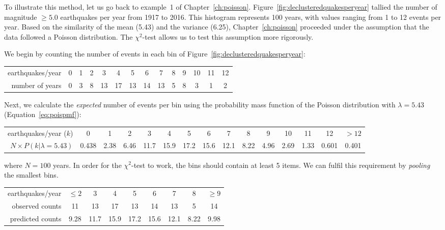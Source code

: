 To illustrate this method, let us go back to example~1 of
Chapter~\ref{ch:poisson}. Figure~\ref{fig:declusteredquakesperyear}
tallied the number of magnitude $\geq{5.0}$ earthquakes per year from
1917 to 2016.  This histogram represents 100 years, with values
ranging from 1 to 12 events per year. Based on the similarity of the
mean (5.43) and the variance (6.25), Chapter~\ref{ch:poisson}
proceeded under the assumption that the data followed a Poisson
distribution.  The $\chi^2$-test allows us to test this assumption
more rigorously.\medskip

We begin by counting the number of events in each bin of
Figure~\ref{fig:declusteredquakesperyear}:

\begin{center}
  \begin{tabular}{r|c@{\gap}c@{\gap}c@{\gap}c@{\gap}c@{\gap}
      c@{\gap}c@{\gap}c@{\gap}c@{\gap}c@{\gap}c@{\gap}c@{\gap}c}
    earthquakes/year &
    0 & 1 & 2 & 3 & 4 & 5 & 6 & 7 & 8 & 9 & 10 & 11 & 12 \\
    number of years &
    0 & 3 & 8 & 13 & 17 & 13 & 14 & 13 & 5 & 8 & 3 & 1 & 2 
  \end{tabular}
\end{center}

Next, we calculate the \textit{expected} number of events per bin
using the probability mass function of the Poisson distribution with
$\lambda=5.43$ (Equation~\ref{eq:poispmf}):

\begin{center}
  \begin{tabular}{@{\gap}r@{\gap}|@{\gap}c@{\gap}c@{\gap}c@{\gap}c@{\gap}c@{\gap}
      c@{\gap}c@{\gap}c@{\gap}c@{\gap}c@{\gap}c@{\gap}c@{\gap}c@{\gap}c@{\gap}}
    earthquakes/year ($k$) &
    0 & 1 & 2 & 3 & 4 & 5 & 6 & 7 & 8 & 9 & 10 & 11 & 12 & $>12$ \\
    $N\times{P}(k|\lambda=5.43)$ &
    0.438 & 2.38 & 6.46 & 11.7 & 15.9 & 17.2 & 15.6 & 12.1 &
    8.22 & 4.96 & 2.69 & 1.33 & 0.601 & 0.401
  \end{tabular}
\end{center}

\noindent where $N=100$ years. In order for the $\chi^2$-test to work,
the bins should contain at least 5 items. We can fulfil this
requirement by \emph{pooling} the smallest bins.

\begin{center}
  \begin{tabular}{r|c@{\gap}c@{\gap}c@{\gap}
      c@{\gap}c@{\gap}c@{\gap}c@{\gap}c}
    earthquakes/year &
    $\leq{2}$ & 3 & 4 & 5 & 6 & 7 & 8 & $\geq{9}$ \\
    observed counts &
    11 & 13 & 17 & 13 & 14 & 13 & 5 & 14 \\
    predicted counts & 9.28 & 11.7 &
    15.9 & 17.2 & 15.6 & 12.1 & 8.22 & 9.98
  \end{tabular}
\end{center}

